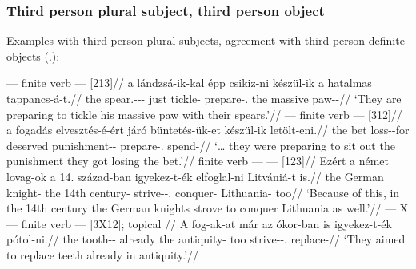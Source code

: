 \subsubsection{Third person plural subject, third person object}\label{sub:3pl-3}

Examples with third person plural subjects, agreement with third person
definite objects (\Tpl.\Obj):

\ex\label{ex:landzsa-keszul}%
    \begingl
        \glpreamble \Inf{} --- finite verb --- \Obj{} [213]//
        \gla 	\nogloss{\dots} a lándzsá-ik-kal épp csikiz-ni készül-ik a hatalmas tappancs-á-t.//
        \glb 	the spear.\Poss-\Pl-\Tpl-\Com{} just tickle-\Inf{} prepare-\Tpl.\Obj{} the massive paw-\Tsg-\Acc{}//
        \glft 	\enquote*{They are preparing to tickle his massive paw with their spears.}\trailingcitation{}//
    \endgl
\xe
\ex\label{ex:buntetes-keszul}%
    \begingl
        \glpreamble \Obj{} --- finite verb --- \Inf{} [312]//
        \gla 	\nogloss{\dots} a fogadás elvesztés-é-ért járó büntetés-ük-et készül-ik letölt-eni.//
        \glb 	the bet loss-\Tsg-for deserved punishment-\Tpl-\Acc{} prepare-\Tpl.\Obj{} spend-\Inf{}//
        \glft 	\enquote*{\dots{} they were preparing to sit out the punishment they got losing the bet.}\trailingcitation{}//
    \endgl
\xe
\ex\label{ex:lovag-igyek}
    \begingl
        \glpreamble finite verb --- \Inf{} --- \Obj{} [123]//
        \gla 	Ezért a német lovag-ok a 14. század-ban igyekez-t-ék elfoglal-ni Litvániá-t is.//
         the German knight-\Pl{} the 14th century-\Ine{} strive-\Pst-\Tpl.\Obj{} conquer-\Inf{} Lithuania-\Acc{} too//
        \glft 	\enquote*{Because of this, in the 14th century the German knights strove to conquer Lithuania as well.}\trailingcitation{}//
    \endgl
\xe
\ex\label{ex:fog-igyek}%
    \begingl
        \glpreamble \Obj{} --- X --- finite verb --- \Inf{} [3X12]; topical \Obj{}//
        \gla 	A fog-ak-at már az ókor-ban is igyekez-t-ék pótol-ni.//
        \glb 	the tooth-\Pl-\Acc{} already the antiquity-\Ine{} too strive-\Pl-\Tpl.\Obj{} replace-\Inf{}//
        \glft 	\enquote*{They aimed to replace teeth already in antiquity.}\trailingcitation{}//
    \endgl
\xe

